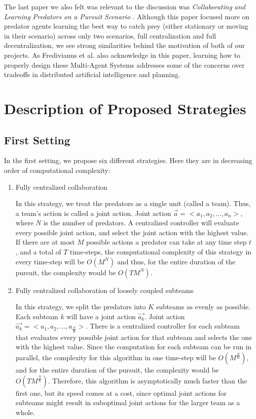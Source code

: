 \documentclass[11pt]{article}
\begin{document}
\begin{multicols}{2}
The last paper we also felt was relevant to the discussion was \textit{ Collaborating and Learning Predators on a Pursuit Scenario } \cite{fredivianus2010collaborating}. Although this paper focused more on predator agents learning the best way to catch prey (either stationary or moving in their scenario) across only two scenarios, full centralization and full decentralization, we see strong similarities behind the motivation of both of our projects. As Fredivianus et al. also acknowledge in this paper, learning how to properly design these Multi-Agent Systems addresses some of the concerns over tradeoffs in distributed artificial intelligence and planning. 

 
\section{Description of Proposed Strategies}
\subsection{First Setting}
In the first setting, we propose six different strategies. Here they are in decreasing order of computational complexity:

\begin{enumerate}[leftmargin=0.25cm]
	\item Fully centralized collaboration
	
	In this strategy, we treat the predators as a single unit (called a team). Thus, a team's action is called a joint action. Joint action $\vec{a} = <a_1, a_2, ..., a_n>$, where $N$ is the number of predators. A centralized controller will evaluate every possible joint action, and select the joint action with the highest value. If there are at most $M$ possible actions a predator can take at any time step $t$, and a total of $T$ time-steps, the computational complexity of this strategy in every time-step will be $O(M^N)$ and thus, for the entire duration of the pursuit, the complexity would be $O(TM^N)$.
	
	\item Fully centralized collaboration of loosely coupled subteams
	
	In this strategy, we split the predators into $K$ subteams as evenly as possible. Each subteam $k$ will have a joint action $\vec{a_k}$. Joint action $\vec{a_k} = <a_1, a_2, ..., a_{\frac{N}{K}}>$. There is a centralized controller for each subteam that evaluates every possible joint action for that subteam and selects the one with the highest value. Since the computation for each subteam can be run in parallel, the complexity for this algorithm in one time-step will be $O(M^{\frac{N}{K}})$, and for the entire duration of the pursuit, the complexity would be $O(TM^{\frac{N}{K}})$. Therefore, this algorithm is asymptotically much faster than the first one, but its speed comes at a cost, since optimal joint actions for subteams might result in suboptimal joint actions for the larger team as a whole. 
	

\end{enumerate}
\end{multicols}
\end{document}
